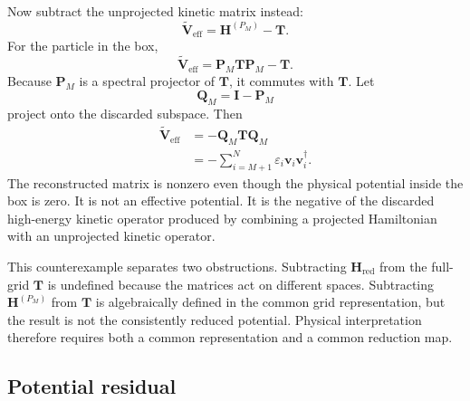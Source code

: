 Now subtract the unprojected kinetic matrix instead:
\begin{equation}
    \widetilde{\mathbf V}_{\mathrm{eff}}
    =
    \mathbf H^{(P_M)}-\mathbf T.
\end{equation}
For the particle in the box,
\begin{equation}
    \widetilde{\mathbf V}_{\mathrm{eff}}
    =
    \mathbf P_M\mathbf T\mathbf P_M-\mathbf T.
\end{equation}
Because $\mathbf P_M$ is a spectral projector of $\mathbf T$, it commutes
with $\mathbf T$. Let
\begin{equation}
    \mathbf Q_M=\mathbf I-\mathbf P_M
\end{equation}
project onto the discarded subspace. Then
\begin{align}
    \widetilde{\mathbf V}_{\mathrm{eff}}
    &=
    -\mathbf Q_M\mathbf T\mathbf Q_M
    \\
    &=
    -\sum_{i=M+1}^{N}
    \varepsilon_i\mathbf v_i\mathbf v_i^\dagger.
\end{align}
The reconstructed matrix is nonzero even though the physical potential inside
the box is zero. It is not an effective potential. It is the negative of the
discarded high-energy kinetic operator produced by combining a projected
Hamiltonian with an unprojected kinetic operator.

This counterexample separates two obstructions. Subtracting
$\mathbf H_{\mathrm{red}}$ from the full-grid $\mathbf T$ is undefined because
the matrices act on different spaces. Subtracting $\mathbf H^{(P_M)}$ from
$\mathbf T$ is algebraically defined in the common grid representation, but
the result is not the consistently reduced potential. Physical interpretation
therefore requires both a common representation and a common reduction map.

\subsection{Potential residual}

